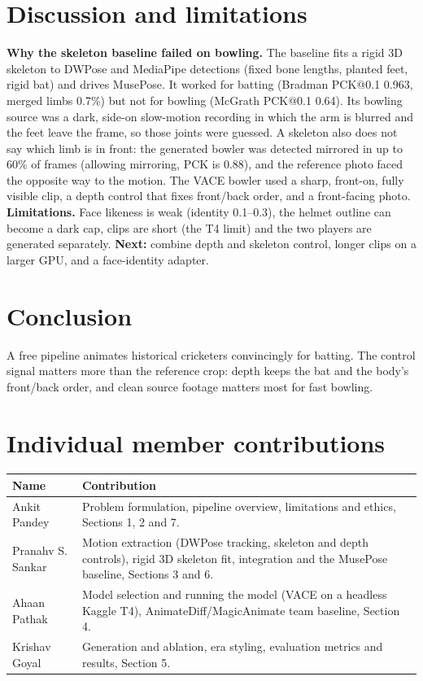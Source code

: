 \documentclass[11pt,a4paper,twocolumn]{article}
\begin{document}
\section{Discussion and limitations}
\textbf{Why the skeleton baseline failed on bowling.} The baseline fits a rigid 3D skeleton to DWPose and MediaPipe
detections (fixed bone lengths, planted feet, rigid bat) and drives MusePose. It worked for batting (Bradman PCK@0.1
0.963, merged limbs 0.7\%) but not for bowling (McGrath PCK@0.1 0.64). Its bowling source was a dark, side-on
slow-motion recording in which the arm is blurred and the feet leave the frame, so those joints were guessed. A
skeleton also does not say which limb is in front: the generated bowler was detected mirrored in up to 60\% of frames
(allowing mirroring, PCK is 0.88), and the reference photo faced the opposite way to the motion. The VACE bowler used a
sharp, front-on, fully visible clip, a depth control that fixes front/back order, and a front-facing photo.
\textbf{Limitations.} Face likeness is weak (identity 0.1--0.3), the helmet outline can become a dark cap, clips are
short (the T4 limit) and the two players are generated separately. \textbf{Next:} combine depth and skeleton control,
longer clips on a larger GPU, and a face-identity adapter.

\section{Conclusion}
A free pipeline animates historical cricketers convincingly for batting. The control signal matters more than the
reference crop: depth keeps the bat and the body's front/back order, and clean source footage matters most for fast
bowling.

\section*{Individual member contributions}
{\small
\begin{tabularx}{\linewidth}{@{}l X@{}}
\toprule
Name & Contribution \\
\midrule
Ankit Pandey & Problem formulation, pipeline overview, limitations and ethics, Sections 1, 2 and 7. \\
Pranahv S. Sankar & Motion extraction (DWPose tracking, skeleton and depth controls), rigid 3D skeleton fit, integration and the MusePose baseline, Sections 3 and 6. \\
Ahaan Pathak & Model selection and running the model (VACE on a headless Kaggle T4), AnimateDiff/MagicAnimate team baseline, Section 4. \\
Krishav Goyal & Generation and ablation, era styling, evaluation metrics and results, Section 5. \\
\bottomrule
\end{tabularx}}
\end{document}
